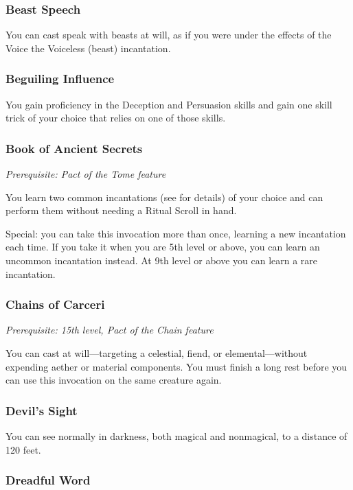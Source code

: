 \subsubsection{Beast Speech}

You can cast speak with beasts at will, as if you were under the effects of the Voice the Voiceless (beast) incantation.

\subsubsection{Beguiling Influence}

You gain proficiency in the Deception and Persuasion skills and gain one skill trick of your choice that relies on one of those skills.

\subsubsection{Book of Ancient Secrets}

\textit{Prerequisite: Pact of the Tome feature}

You learn two common incantations (see  for details) of your choice and can perform them without needing a Ritual Scroll in hand.

Special: you can take this invocation more than once, learning a new incantation each time. If you take it when you are 5th level or above, you can learn an uncommon incantation instead. At 9th level or above you can learn a rare incantation.

\subsubsection{Chains of Carceri}

\textit{Prerequisite: 15th level, Pact of the Chain feature}

You can cast  at will—targeting a celestial, fiend, or elemental—without expending aether or material components. You must finish a long rest before you can use this invocation on the same creature again.

\subsubsection{Devil's Sight}

You can see normally in darkness, both magical and nonmagical, to a distance of 120 feet.

\subsubsection{Dreadful Word}

